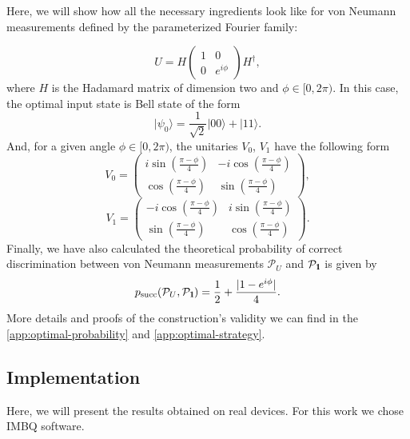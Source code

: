 \documentclass[preprint,12pt, a4paper, dvipsnames]{elsarticle}
\newcommand{\ket}[1]{\ensuremath{|#1\rangle}}
\newcommand{\1}{{\rm 1\hspace{-0.9mm}l}}
\newcommand{\Id}{{\rm 1\hspace{-0.9mm}l}}
\newcommand{\PP}{\mathcal{P}}
\begin{document}
Here,  we will show how all the necessary ingredients look like for
von Neumann measurements defined by the parameterized Fourier family:

\begin{equation}
	U = H
	\left(\begin{array}{cc}1&0\\0&e^{i \phi}\end{array}\right)  H^\dagger,
\end{equation}
where $H$ is the Hadamard matrix of dimension two and $\phi \in [0, 2 \pi)$.
In this case, the optimal input state is Bell state of the form
\begin{equation}
	\ket{\psi_{0}} = \frac{1}{\sqrt{2}} \ket{00} + \ket{11}.
\end{equation}
And, for a given angle  $\phi \in  [0, 2 \pi)$,   the unitaries $V_0$,  $V_1$
have the following form
\begin{equation}
	V_0 = \left(\begin{array}{cc}i \sin\left( \frac{\pi - \phi}{4} \right)&-i
		\cos\left( \frac{\pi - \phi}{4} \right)\\ \cos\left( \frac{\pi -
			\phi}{4}\right)& \sin\left( \frac{\pi - \phi}{4} \right)\end{array}\right),
\end{equation}
\begin{equation}
	V_1 = \left(\begin{array}{cc}-i \cos\left(\frac{\pi - \phi}{4}\right) &i
		\sin\left( \frac{\pi - \phi}{4}\right)\\\sin\left( \frac{\pi - \phi}{4} \right)
		&  \cos\left( \frac{\pi - \phi}{4} \right) \end{array}\right).
\end{equation}
Finally, we have also calculated the theoretical probability of correct discrimination between von Neumann
measurements $\PP_U$ and $\PP_{\Id}$ is given by
\begin{equation}
	p_{\text{succ}}(\PP_{U}, \PP_{\Id}) = \frac{1}{2} + \frac{|1 - e^{i \phi}  |}{4} .
\end{equation}
More details and proofs of the construction's validity   we can find in the \ref{app:optimal-probability} and \ref{app:optimal-strategy}.









\subsection{Implementation}
Here, we will present the results obtained on real devices. For this work we chose IMBQ software. 
\end{document}
